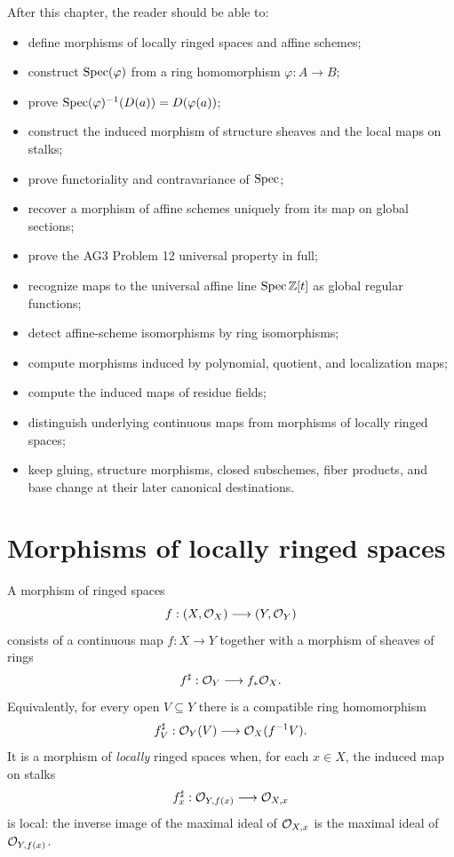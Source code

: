 After this chapter, the reader should be able to:
\begin{itemize}
\item define morphisms of locally ringed spaces and affine schemes;
\item construct $\operatorname{Spec}(\varphi)$ from a ring homomorphism $\varphi:A\to B$;
\item prove $\operatorname{Spec}(\varphi)^{-1}(D(a))=D(\varphi(a))$;
\item construct the induced morphism of structure sheaves and the local maps on stalks;
\item prove functoriality and contravariance of $\operatorname{Spec}$;
\item recover a morphism of affine schemes uniquely from its map on global sections;
\item prove the AG3 Problem 12 universal property in full;
\item recognize maps to the universal affine line $\operatorname{Spec}\mathbb Z[t]$ as global regular functions;
\item detect affine-scheme isomorphisms by ring isomorphisms;
\item compute morphisms induced by polynomial, quotient, and localization maps;
\item compute the induced maps of residue fields;
\item distinguish underlying continuous maps from morphisms of locally ringed spaces;
\item keep gluing, structure morphisms, closed subschemes, fiber products, and base change at
  their later canonical destinations.
\end{itemize}



\section{Morphisms of locally ringed spaces}

A morphism of ringed spaces
\[
f:(X,\mathcal O_X)\longrightarrow(Y,\mathcal O_Y)
\]
consists of a continuous map $f:X\to Y$ together with a morphism of sheaves of rings
\[
f^\sharp:\mathcal O_Y\longrightarrow f_*\mathcal O_X.
\]
Equivalently, for every open $V\subseteq Y$ there is a compatible ring homomorphism
\[
f_V^\sharp:\mathcal O_Y(V)\longrightarrow\mathcal O_X(f^{-1}V).
\]
It is a morphism of \emph{locally} ringed spaces when, for each $x\in X$, the induced map
on stalks
\[
f_x^\sharp:\mathcal O_{Y,f(x)}\longrightarrow\mathcal O_{X,x}
\]
is local: the inverse image of the maximal ideal of $\mathcal O_{X,x}$ is the maximal ideal of
$\mathcal O_{Y,f(x)}$.

